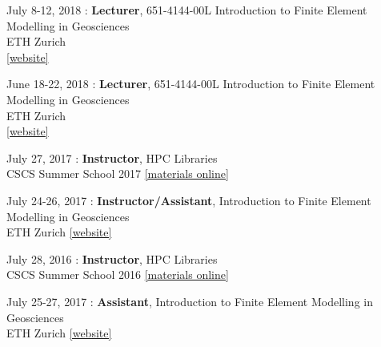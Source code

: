 \begin{samepage}
\noindent July 8-12, 2018 : \textbf{Lecturer}, 651-4144-00L Introduction to Finite Element Modelling in Geosciences \\
ETH Zurich\\
\href{http://jupiter.ethz.ch/~gfdteaching/femblockcourse/2019/}{[website]}\\
\end{samepage}

\begin{samepage}
\noindent June 18-22, 2018 : \textbf{Lecturer}, 651-4144-00L Introduction to Finite Element Modelling in Geosciences \\
ETH Zurich\\
\href{http://jupiter.ethz.ch/~gfdteaching/femblockcourse/2018/}{[website]}\\
\end{samepage}

\begin{samepage}
\noindent July 27, 2017 : \textbf{Instructor}, HPC Libraries \\
CSCS Summer School 2017
\href{https://github.com/eth-cscs/SummerSchool2017}{[materials online]}\\
\end{samepage}

\begin{samepage}
\noindent July 24-26, 2017 : \textbf{Instructor/Assistant}, Introduction to Finite Element Modelling in Geosciences \\
ETH Zurich
\href{https://jupiter2.ethz.ch/~gfdteaching/femblockcourse/2017/}{[website]}\\
\end{samepage}

\begin{samepage}
\noindent July 28, 2016 : \textbf{Instructor}, HPC Libraries \\
CSCS Summer School 2016
\href{https://github.com/eth-cscs/SummerSchool2016}{[materials online]}\\
\end{samepage}

\begin{samepage}
\noindent July 25-27, 2017 : \textbf{Assistant}, Introduction to Finite Element Modelling in Geosciences \\
ETH Zurich
\href{http://jupiter.ethz.ch/~gfdteaching/femblockcourse/2016/}{[website]}\\
\end{samepage}

